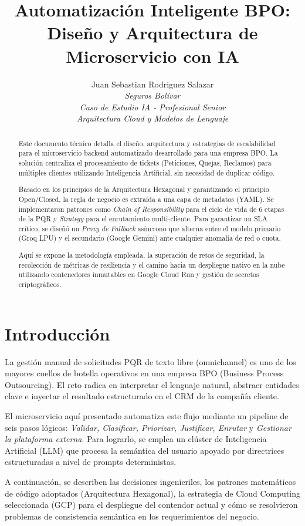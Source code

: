 \documentclass[twocolumn]{article}
\title{\textbf{Automatización Inteligente BPO: Diseño y Arquitectura de Microservicio con IA}}
\author{
    Juan Sebastian Rodriguez Salazar \\
    \textit{Seguros Bolívar}\\
    \textit{Caso de Estudio IA - Profesional Senior}\\
    \textit{Arquitectura Cloud y Modelos de Lenguaje}
}
\date{}
\numberwithin{definition}{subsection}
\begin{document}
\maketitle

\begin{abstract}
Este documento técnico detalla el diseño, arquitectura y estrategias de escalabilidad para el microservicio backend automatizado desarrollado para una empresa BPO. La solución centraliza el procesamiento de tickets (Peticiones, Quejas, Reclamos) para múltiples clientes utilizando Inteligencia Artificial, sin necesidad de duplicar código.

Basado en los principios de la Arquitectura Hexagonal y garantizando el principio Open/Closed, la regla de negocio es extraída a una capa de metadatos (YAML). Se implementaron patrones como \textit{Chain of Responsibility} para el ciclo de vida de 6 etapas de la PQR y \textit{Strategy} para el enrutamiento multi-cliente. Para garantizar un SLA crítico, se diseñó un \textit{Proxy de Fallback} asíncrono que alterna entre el modelo primario (Groq LPU) y el secundario (Google Gemini) ante cualquier anomalía de red o cuota. 

Aquí se expone la metodología empleada, la superación de retos de seguridad, la recolección de métricas de resiliencia y el camino hacia un despliegue nativo en la nube utilizando contenedores inmutables en Google Cloud Run y gestión de secretos criptográficos.
\end{abstract}

\section{Introducción}

La gestión manual de solicitudes PQR de texto libre (omnichannel) es uno de los mayores cuellos de botella operativos en una empresa BPO (Business Process Outsourcing). El reto radica en interpretar el lenguaje natural, abstraer entidades clave e inyectar el resultado estructurado en el CRM de la compañía cliente. 

El microservicio aquí presentado automatiza este flujo mediante un pipeline de seis pasos lógicos: \textit{Validar, Clasificar, Priorizar, Justificar, Enrutar} y \textit{Gestionar la plataforma externa}. Para lograrlo, se emplea un clúster de Inteligencia Artificial (LLM) que procesa la semántica del usuario apoyado por directrices estructuradas a nivel de prompts deterministas.

A continuación, se describen las decisiones ingenieriles, los patrones matemáticos de código adoptados (Arquitectura Hexagonal), la estrategia de Cloud Computing seleccionada (GCP) para el despliegue del contendor actual y cómo se resolvieron problemas de consistencia semántica en los requerimientos del negocio.
\end{document}
